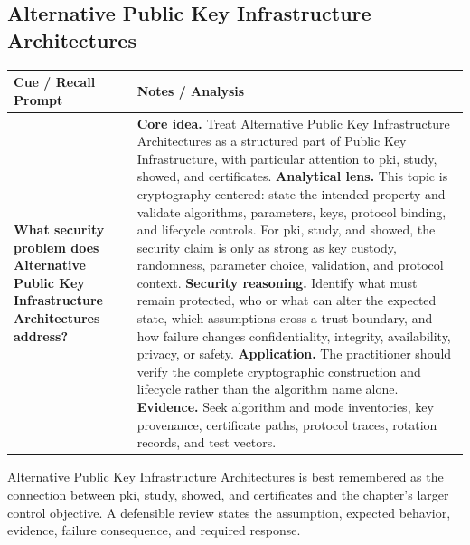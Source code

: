 \documentclass[11pt]{article}
\newcommand{\CornellHeader}{%
\rowcolor{Navy}\color{white}\bfseries Cue / Recall Prompt & \color{white}\bfseries Notes / Analysis\\\hline}
\newcommand{\CornellRow}[2]{%
\cellcolor{CueGray}\RaggedRight\textbf{#1} & \RaggedRight #2\\\hline}
\begin{document}
\subsection*{Alternative Public Key Infrastructure Architectures}
\begin{longtable}{>{\RaggedRight\arraybackslash}p{}|>{\RaggedRight\arraybackslash}p{}}
\CornellHeader
\CornellRow{What security problem does Alternative Public Key Infrastructure Architectures address?}{\textbf{Core idea.} Treat Alternative Public Key Infrastructure Architectures as a structured part of Public Key Infrastructure, with particular attention to pki, study, showed, and certificates. \textbf{Analytical lens.} This topic is cryptography-centered: state the intended property and validate algorithms, parameters, keys, protocol binding, and lifecycle controls. For pki, study, and showed, the security claim is only as strong as key custody, randomness, parameter choice, validation, and protocol context. \textbf{Security reasoning.} Identify what must remain protected, who or what can alter the expected state, which assumptions cross a trust boundary, and how failure changes confidentiality, integrity, availability, privacy, or safety. \textbf{Application.} The practitioner should verify the complete cryptographic construction and lifecycle rather than the algorithm name alone. \textbf{Evidence.} Seek algorithm and mode inventories, key provenance, certificate paths, protocol traces, rotation records, and test vectors.}
\end{longtable}
\begin{topicsummary}
Alternative Public Key Infrastructure Architectures is best remembered as the connection between pki, study, showed, and certificates and the chapter's larger control objective. A defensible review states the assumption, expected behavior, evidence, failure consequence, and required response.
\end{topicsummary}
\end{document}
